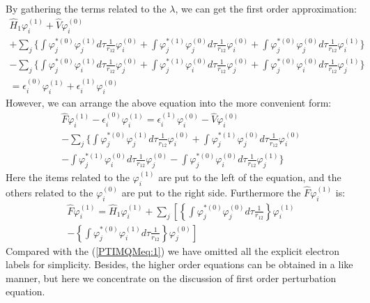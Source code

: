 By gathering the terms related to the $\lambda$, we can get the
first order approximation:
\begin{multline}\label{PTIMQMeq:6}
\hat{H}_{1}\varphi^{(1)}_{i} + \hat{V}\varphi^{(0)}_{i} \\
+\sum_{j}\Bigg\{
\int\varphi^{*(0)}_{j}\varphi^{(1)}_{j}d\tau\frac{1}{r_{12}}\varphi^{(0)}_{i}
+
\int\varphi^{*(1)}_{j}\varphi^{(0)}_{j}d\tau\frac{1}{r_{12}}\varphi^{(0)}_{i}
+
\int\varphi^{*(0)}_{j}\varphi^{(0)}_{j}d\tau\frac{1}{r_{12}}\varphi^{(1)}_{i}
\Bigg\} \\
-\sum_{j}\Bigg\{
\int\varphi^{*(0)}_{j}\varphi^{(1)}_{i}d\tau\frac{1}{r_{12}}\varphi^{(0)}_{j}
+
\int\varphi^{*(1)}_{j}\varphi^{(0)}_{i}d\tau\frac{1}{r_{12}}\varphi^{(0)}_{j}
+
\int\varphi^{*(0)}_{j}\varphi^{(0)}_{i}d\tau\frac{1}{r_{12}}\varphi^{(1)}_{j}
\Bigg\} \\
=\epsilon^{(0)}_{i}\varphi^{(1)}_{i} +
\epsilon^{(1)}_{i}\varphi^{(0)}_{i}
\end{multline}
However, we can arrange the above equation into the more convenient
form:
\begin{multline}\label{PTIMQMeq:5}
\hat{F}\varphi^{(1)}_{i} - \epsilon^{(0)}_{i}\varphi^{(1)}_{i} =
\epsilon^{(1)}_{i}\varphi^{(0)}_{i} - \hat{V}\varphi^{(0)}_{i} \\
-\sum_{j}\Bigg\{
\int\varphi^{*(0)}_{j}\varphi^{(1)}_{j}d\tau\frac{1}{r_{12}}\varphi^{(0)}_{i}
+
\int\varphi^{*(1)}_{j}\varphi^{(0)}_{j}d\tau\frac{1}{r_{12}}\varphi^{(0)}_{i}
\\
-
\int\varphi^{*(1)}_{j}\varphi^{(0)}_{i}d\tau\frac{1}{r_{12}}\varphi^{(0)}_{j}
-
\int\varphi^{*(0)}_{j}\varphi^{(0)}_{i}d\tau\frac{1}{r_{12}}\varphi^{(1)}_{j}
\Bigg\}
\end{multline}
Here the items related to the $\varphi^{(1)}_{i}$ are put to the
left of the equation, and the others related to the
$\varphi^{(0)}_{i}$ are put to the right side. Furthermore the
$\hat{F}\varphi^{(1)}_{i}$ is:
\begin{multline}\label{PTIMQMeq:18}
\hat{F}\varphi^{(1)}_{i} = \hat{H}_{1}\varphi^{(1)}_{i} +
\sum_{j}\left[
\left\{\int\varphi^{*(0)}_{j}\varphi^{(0)}_{j}d\tau\frac{1}{r_{12}}\right\}
\varphi^{(1)}_{i}
\right. \\
 -
\left.
\left\{\int\varphi^{*(0)}_{j}\varphi^{(1)}_{i}d\tau\frac{1}{r_{12}}\right\}
\varphi^{(0)}_{j} \right]
\end{multline}
Compared with the (\ref{PTIMQMeq:1}) we have omitted all the
explicit electron labels for simplicity. Besides, the higher order
equations can be obtained in a like manner, but here we concentrate
on the discussion of first order perturbation equation.

